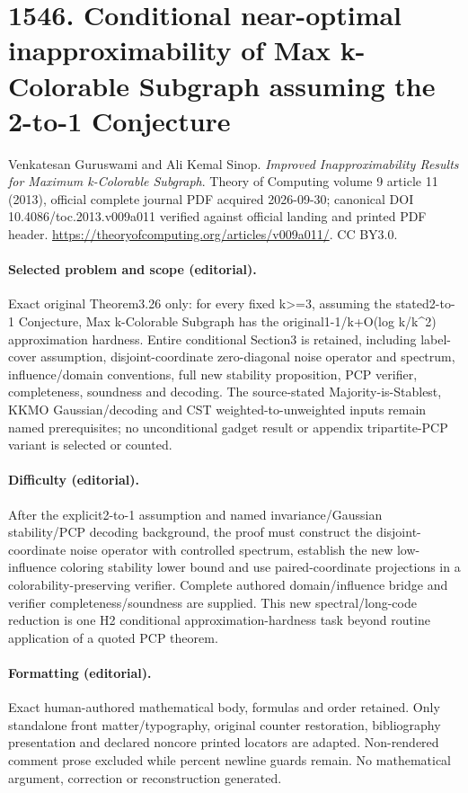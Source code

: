 \documentclass[10pt]{article}
\theoremstyle{definition}
\numberwithin{equation}{section}
\begin{document}
\section*{1546. Conditional near-optimal inapproximability of Max k-Colorable Subgraph assuming the 2-to-1 Conjecture}
Venkatesan Guruswami and Ali Kemal Sinop. \emph{Improved Inapproximability Results for Maximum k-Colorable Subgraph}. Theory of Computing volume 9 article 11 (2013), official complete journal PDF acquired 2026-09-30; canonical DOI 10.4086/toc.2013.v009a011 verified against official landing and printed PDF header. \url{https://theoryofcomputing.org/articles/v009a011/}. CC BY3.0.
\paragraph{Selected problem and scope (editorial).} Exact original Theorem3.26 only: for every fixed k>=3, assuming the stated2-to-1 Conjecture, Max k-Colorable Subgraph has the original1-1/k+O(log k/k\textasciicircum{}2) approximation hardness. Entire conditional Section3 is retained, including label-cover assumption, disjoint-coordinate zero-diagonal noise operator and spectrum, influence/domain conventions, full new stability proposition, PCP verifier, completeness, soundness and decoding. The source-stated Majority-is-Stablest, KKMO Gaussian/decoding and CST weighted-to-unweighted inputs remain named prerequisites; no unconditional gadget result or appendix tripartite-PCP variant is selected or counted.
\paragraph{Difficulty (editorial).} After the explicit2-to-1 assumption and named invariance/Gaussian stability/PCP decoding background, the proof must construct the disjoint-coordinate noise operator with controlled spectrum, establish the new low-influence coloring stability lower bound and use paired-coordinate projections in a colorability-preserving verifier. Complete authored domain/influence bridge and verifier completeness/soundness are supplied. This new spectral/long-code reduction is one H2 conditional approximation-hardness task beyond routine application of a quoted PCP theorem.
\paragraph{Formatting (editorial).} Exact human-authored mathematical body, formulas and order retained. Only standalone front matter/typography, original counter restoration, bibliography presentation and declared noncore printed locators are adapted. Non-rendered comment prose excluded while percent newline guards remain. No mathematical argument, correction or reconstruction generated.
\end{document}

